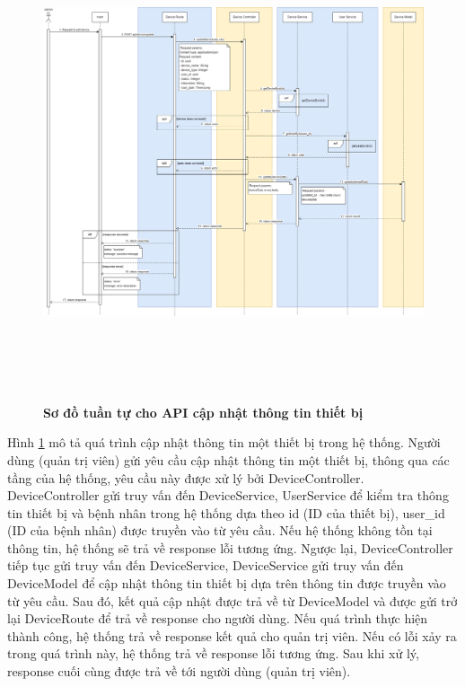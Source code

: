 \begin{figure}[H]
  \centering
  \includegraphics[width=16cm,height=14cm]{Images/sequence_api/editDevice.png}
  \caption[Sơ đồ tuần tự cho API cập nhật thông tin thiết bị ]{\bfseries \fontsize{12pt}{0pt}
  \selectfont Sơ đồ tuần tự cho API cập nhật thông tin thiết bị }
  \label{editDevice} %
\end{figure}
Hình \ref{editDevice} mô tả quá trình cập nhật thông tin một thiết bị trong hệ thống. Người dùng (quản trị viên) gửi yêu cầu cập nhật thông tin một thiết bị, thông qua các tầng của hệ thống, 
yêu cầu này được xử lý bởi DeviceController. DeviceController gửi truy vấn đến DeviceService, UserService để kiểm tra thông tin thiết bị và bệnh nhân trong hệ thống dựa theo id (ID của thiết bị),
 user\_id (ID của bệnh nhân) được truyền vào từ yêu cầu. Nếu hệ thống không tồn tại thông tin, hệ thống sẽ trả về response lỗi tương ứng. Ngược lại, DeviceController tiếp tục gửi truy vấn đến DeviceService, 
 DeviceService gửi truy vấn đến DeviceModel để cập nhật thông tin thiết bị dựa trên thông tin được truyền vào từ yêu cầu. Sau đó, kết quả cập nhật được trả về từ DeviceModel và được gửi trở lại DeviceRoute để 
 trả về response cho người dùng. Nếu quá trình thực hiện thành công, hệ thống trả về response kết quả cho quản trị viên. Nếu có lỗi xảy ra trong quá trình này, hệ thống trả về response lỗi tương ứng. Sau khi xử lý, response cuối cùng được trả về tới người dùng (quản trị viên).

